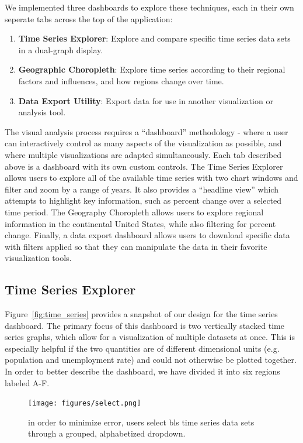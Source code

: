 \documentclass[11pt,letterpaper]{article}
\begin{document}
We implemented three dashboards to explore these techniques, each in their own seperate tabs across the top of the application:

\begin{enumerate}
    \item \textbf{Time Series Explorer}: Explore and compare specific time series data sets in a dual-graph display.
    \item \textbf{Geographic Choropleth}: Explore time series according to their regional factors and influences, and how regions change over time.
    \item \textbf{Data Export Utility}: Export data for use in another visualization or analysis tool. 
\end{enumerate}

The visual analysis process requires a ``dashboard'' methodology - where a user can interactively control as many aspects of the visualization as possible, and where multiple visualizations are adapted simultaneously. Each tab described above is a dashboard with its own custom controls. The Time Series Explorer allows users to explore all of the available time series with two chart windows and filter and zoom by a range of years. It also provides a ``headline view'' which attempts to highlight key information, such as percent change over a selected time period. The Geography Choropleth allows users to explore regional information in the continental United States, while also filtering for percent change. Finally, a data export dashboard allows users to download specific data with filters applied so that they can manipulate the data in their favorite visualization tools.

\subsection{Time Series Explorer}

Figure~\ref{fig:time_series} provides a snapshot of our design for the time series dashboard. The primary focus of this dashboard is two vertically stacked time series graphs, which allow for a visualization of multiple datasets at once. This is especially helpful if the two quantities are of different dimensional units (e.g. population and unemployment rate) and could not otherwise be plotted together. In order to better describe the dashboard, we have divided it into six regions labeled A-F.

\begin{figure}[ht]
    \centering
    \texttt{[image: figures/select.png]}
    \caption{in order to minimize error, users select bls time series data sets through a grouped, alphabetized dropdown.}
    \label{fig:select}
\end{figure}
\end{document}
